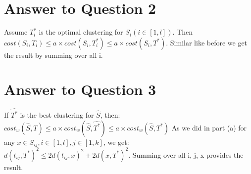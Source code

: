\documentclass[11pt]{article}
\begin{document}
\section*{Answer to Question 2}
Assume $T^{*}_i$ is the optimal clustering for $S_i (i \in [1, l])$. Then $cost(S_i, T_i) \leq a\times cost(S_i, T^{*}_i) \leq a \times cost(S_i, T^{*})$. 
Similar like before we get the result by summing over all i.
\section*{Answer to Question 3}
If $\hat{T^*}$ is the best clustering for $\hat{S}$, then: $cost_w(\hat{S},T)\leq a \times cost_w(\hat{S},\hat{T^*}) \leq a \times cost_w(\hat{S},T^*) $
As we did in part (a) for any $x \in S_{ij}, i \in [1, l] , j \in [1, k]$, we  get:
 $d(t_{ij},T^*)^2 \leq 2d(t_{ij}, x)^2 + 2d(x,T^*)^2 $. Summing over all i, j, x provides the result.
\end{document}
